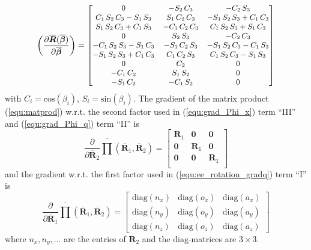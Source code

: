\documentclass[robotics,article,submit,moreauthors,pdftex]{Definitions/mdpi}
\newcommand{\bm}[1]{\boldsymbol{#1}}
\begin{document}
\begin{align}
    \left(\frac{\partial \overline{\bm{R}}(\overline{\bm{\beta}})}{\partial \overline{\bm{\beta}}}\right)
    =
    \small
    \begin{bmatrix}
        0&-{ S_2}\,{ C_3}&-{ C_2}\,{ S_3}
        \\ { C_1}\,{ S_2}\,{ C_3}-{ S_1}\,{ S_3}&{
            S_1}\,{ C_2}\,{ C_3}&-{ S_1}\,{ S_2}\,{ S_3}+{ C_1}\,{
            C_3}\\ { S_1}\,{ S_2}\,{ C_3}+{ C_1}\,{
            S_3}&-{ C_1}\,{ C_2}\,{ C_3}&{ C_1}\,{ S_2}\,{ S_3}+{
            S_1}\,{ C_3}\\ 0&{ S_2}\,{ S_3}&-{ C_2}\,
        { C_3}\\ -{ C_1}\,{ S_2}\,{ S_3}-{ S_1}\,{
            C_3}&-{ S_1}\,{ C_2}\,{ S_3}&-{ S_1}\,{ S_2}\,{ C_3}-{
            C_1}\,{ S_3}\\ -{ S_1}\,{ S_2}\,{ S_3}+{
            C_1}\,{ C_3}&{ C_1}\,{ C_2}\,{ S_3}&{ C_1}\,{ S_2}\,{
            C_3}-{ S_1}\,{ S_3}\\ 0&{ C_2}&0
        \\ -{ C_1}\,{ C_2}&{ S_1}\,{ S_2}&0
        \\ -{ S_1}\,{ C_2}&-{ C_1}\,{ S_2}&0
        \end {bmatrix}  \nonumber
    \end{align}
    with $C_i=\mathrm{cos}(\beta_i)$, $S_i=\mathrm{sin}(\beta_i)$.
    The gradient of the matrix product (\ref{equ:matprod}) w.r.t. the second factor used in (\ref{equ:grad_Phi_x}) term ``III'' and (\ref{equ:grad_Phi_q}) term ``II'' is
    \begin{equation}
    \frac{\partial }{\partial \overline{\bm{R}}_2}
    \overline{\prod}\left( \overline{\bm{R}}_1, \overline{\bm{R}}_2\right)
    =
    \begin{bmatrix}
    \bm{R}_1 & \bm{0} & \bm{0} \\
    \bm{0} & \bm{R}_1 & \bm{0} \\
    \bm{0} & \bm{0} & \bm{R}_1  \\
    \end{bmatrix}
    \end{equation}
    and the gradient w.r.t. the first factor used in (\ref{equ:ee_rotation_gradq}) term ``I'' is
    \begin{equation}
    \frac{\partial }{\partial \overline{\bm{R}}_1}
    \overline{\prod}\left( \overline{\bm{R}}_1, \overline{\bm{R}}_2\right)
    =
    \begin{bmatrix}
    {\mathrm{diag}}(n_x)&{\mathrm{diag}}(o_x)&{\mathrm{diag}}(a_x) \\ {\mathrm{diag}}(n_y)&{\mathrm{diag}}(o_y)&{\mathrm{diag}}(a_y)\\ {\mathrm{diag}}(n_z)&{\mathrm{diag}}(o_z)&{\mathrm{diag}}(a_z)
    \end{bmatrix}
    \end{equation}
    where $n_x,n_y,...$ are the entries of $\bm{R}_2$ and the $\mathrm{diag}$-matrices are $3 \times 3$.
\end{document}

